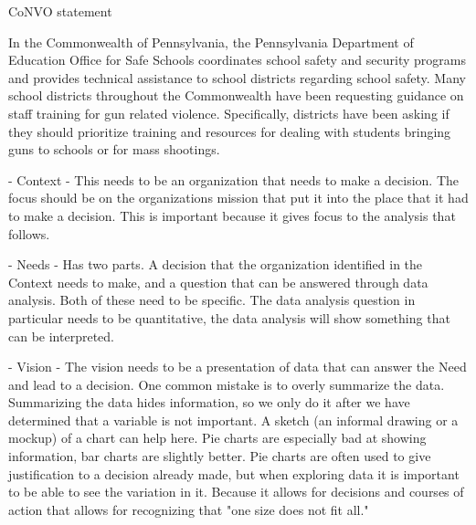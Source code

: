 \documentclass[12pt, letter, addpoints]{exam}
\begin{document}
\begin{questions}

\question[35]  CoNVO statement

In the Commonwealth of Pennsylvania, the Pennsylvania Department of Education Office for Safe Schools coordinates school safety and security programs and provides technical assistance to school districts regarding school safety. 
Many school districts throughout the Commonwealth have been requesting guidance on staff training for gun related violence. 
Specifically, districts have been asking if they should prioritize training and resources for dealing with students bringing guns to schools or for mass shootings.


\begin{solution}[3in]

- Context - This needs to be an organization that needs to make a decision. The focus should be on the organizations mission that put it into the place that it had to make a decision.  This is important because it gives focus to the analysis that follows.

-  Needs - Has two parts.  A decision that the organization identified in the Context needs to make, and a question that can be answered through data analysis. Both of these need to be specific. The data analysis question in particular needs to be quantitative, the data analysis will show something that can be interpreted.

-  Vision - The vision needs to be a presentation of data that can answer the Need and lead to a decision.  One common mistake is to overly summarize the data.  Summarizing the data hides information, so we only do it after we have determined that a variable is not important.  A sketch (an informal drawing or a mockup) of a chart can help here. Pie charts are especially bad at showing information, bar charts are slightly better.  Pie charts are often used to give justification to a decision already made, but when exploring data it is important to be able to see the variation in it. Because it allows for decisions and courses of action that allows for recognizing that "one size does not fit all."  


\end{solution}
\end{questions}
\end{document}
